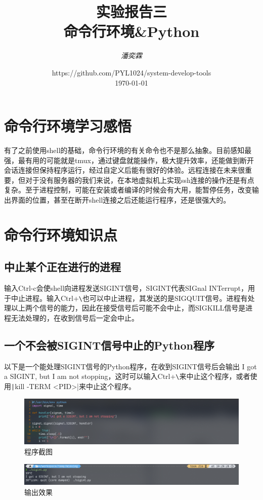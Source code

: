 \documentclass[fontset=ubuntu]{ctexart}
\title{\Huge \textbf{实验报告三 \\ 命令行环境\&Python}}
\author{\textit{潘奕霖}}
\date{https://github.com/PYL1024/system-develop-tools\\ \today}
\begin{document}
\maketitle
\newpage

\tableofcontents
\newpage

\section{命令行环境学习感悟}
有了之前使用shell的基础，命令行环境的有关命令也不是那么抽象。目前感知最强，最有用的可能就是tmux，通过键盘就能操作，极大提升效率，还能做到断开会话连接但保持程序运行，经过自定义后能有很好的体验。远程连接在未来很重要，但对于没有服务器的我们来说，在本地虚拟机上实现ssh连接的操作还是有点复杂。至于进程控制，可能在安装或者编译的时候会有大用，能暂停任务，改变输出界面的位置，甚至在断开shell连接之后还能运行程序，还是很强大的。

\section{命令行环境知识点}
\subsection{中止某个正在进行的进程}
输入Ctrl-c会使shell向进程发送SIGINT信号，SIGINT代表SIGnal INTerrupt，用于中止进程。输入Ctrl+\verb|\|也可以中止进程，其发送的是SIGQUIT信号。进程有处理以上两个信号的能力，因此在接受信号后可能不会中止，而SIGKILL信号是进程无法处理的，在收到信号后一定会中止。

\subsection{一个不会被SIGINT信号中止的Python程序}
以下是一个能处理SIGINT信号的Python程序，在收到SIGINT信号后会输出
I got a SIGINT, but I am not stopping，这时可以输入Ctrl+\verb|\|来中止这个程序，或者使用\texttt|kill -TERM <PID>|来中止这个程序。
\begin{figure}[htb]
    \centering
    \includegraphics[width=0.75\linewidth]{Sigint_1.png}
    \caption{程序截图}
    \label{fig:Sigint_1}
\end{figure}

\begin{figure}[htb]
    \centering
    \includegraphics[width=0.75\linewidth]{Ctrl_1.png}
    \caption{输出效果}
    \label{fig:Ctrl_1}
\end{figure}
\end{document}
